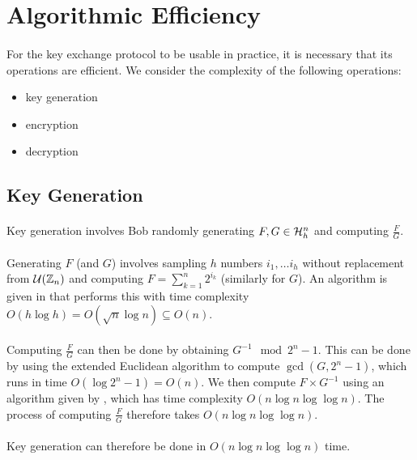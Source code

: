 \section{Algorithmic Efficiency}
\paragraph{}
For the key exchange protocol to be usable in practice, it is necessary that its operations are efficient. We consider the complexity of the following operations:
\begin{itemize}
    \item key generation
    \item encryption
    \item decryption
\end{itemize}

\subsection{Key Generation}
\paragraph{}
Key generation involves Bob randomly generating $F, G \in \mathcal{H}_h^n$ and computing $\frac{F}{G}$.

\paragraph{}
Generating $F$ (and $G$) involves sampling $h$ numbers $i_1, \dots i_h$ without replacement from $\mathcal{U}(\mathbb{Z}_n)$ and computing $F = \sum_{k = 1}^n 2^{i_k}$ (similarly for $G$). An algorithm is given in \cite{10.1007/3-540-13883-8_89} that performs this with time complexity $O(h \log{h}) = O(\sqrt{n} \log{n}) \subseteq O(n)$.

\paragraph{}
Computing $\frac{F}{G}$ can then be done by obtaining $G^{-1} \mod{2^n - 1}$. This can be done by using the extended Euclidean algorithm to compute $\gcd(G, 2^n - 1)$, which runs in time $O(\log{2^n - 1}) = O(n)$. We then compute $F \times G^{-1}$ using an algorithm given by \cite{schonhage1971schnelle}, which has time complexity $O(n \log{n} \log{\log{n}})$. The process of computing $\frac{F}{G}$ therefore takes $O(n \log{n} \log{\log{n}})$.

\paragraph{}
Key generation can therefore be done in $O(n \log{n} \log{\log{n}})$ time.

